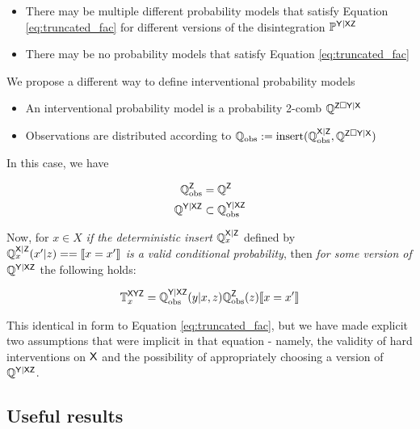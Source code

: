 \begin{itemize}
	\item There may be multiple different probability models that satisfy Equation \ref{eq:truncated_fac} for different versions of the disintegration $\mathbb{P}^{\mathsf{Y|XZ}}$
	\item There may be no probability models that satisfy Equation \ref{eq:truncated_fac}
\end{itemize}

We propose a different way to define interventional probability models

\begin{itemize}
	\item An interventional probability model is a probability 2-comb $\mathbb{Q}^{\mathsf{Z}\square\mathsf{Y}|\mathsf{X}}$
	\item Observations are distributed according to $\mathbb{Q}_{\text{obs}}:=\text{insert}(\mathbb{Q}_{\text{obs}}^{\mathsf{X}|\mathsf{Z}},\mathbb{Q}^{\mathsf{Z}\square\mathsf{Y}|\mathsf{X}})$
\end{itemize}

In this case, we have

\begin{align}
	\mathbb{Q}_{\text{obs}}^{\mathsf{Z}} &= \mathbb{Q}^{\mathsf{Z}}\\
	\mathbb{Q}^{\mathsf{Y}|\mathsf{XZ}}&\subset \mathbb{Q}_{\text{obs}}^{\mathsf{Y}|\mathsf{XZ}}
\end{align}

Now, for $x\in X$ \emph{if the deterministic insert} $\mathbb{Q}_{x}^{\mathsf{X}|\mathsf{Z}}$ defined by $\mathbb{Q}_{x}^{\mathsf{X}|\mathsf{Z}}(x'|z) == \llbracket x=x' \rrbracket$ \emph{is a valid conditional probability}, then \emph{for some version of } $\mathbb{Q}^{\mathsf{Y}|\mathsf{XZ}}$ the following holds:

\begin{align}
	\mathbb{T}_x^{\mathsf{XYZ}} = \mathbb{Q}_{\text{obs}}^{\mathsf{Y|XZ}}(y|x,z)\mathbb{Q}_{\text{obs}}^{\mathsf{Z}}(z)\llbracket x=x' \rrbracket
\end{align}

This identical in form to Equation \ref{eq:truncated_fac}, but we have made explicit two assumptions that were implicit in that equation - namely, the validity of hard interventions on $\mathsf{X}$ and the possibility of appropriately choosing a version of $\mathbb{Q}^{\mathsf{Y}|\mathsf{XZ}}$.

\subsection{Useful results}

